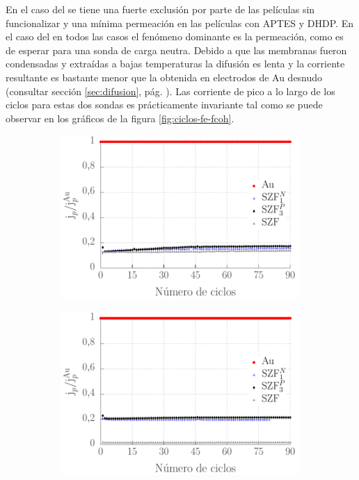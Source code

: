 		
		En el caso del \fe\space se tiene una fuerte exclusión por parte de las películas sin funcionalizar y una mínima permeación en las películas con APTES y DHDP. 
		En el caso del \fc\space en todos las casos el fenómeno dominante es la permeación, como es de esperar para una sonda de carga neutra. Debido a que las membranas fueron condensadas y extraídas a bajas temperaturas la difusión es lenta y la corriente resultante es bastante menor que la obtenida en electrodos de Au desnudo (consultar sección \ref{sec:difusion}, pág. \pageref{sec:difusion}). Las corriente de pico a lo largo de los ciclos para estas dos sondas es prácticamente invariante tal como se puede observar en los gráficos de la figura \ref{fig:ciclos-fe-fcoh}.\vspace*{-4mm}

			\begin{figure}[t!]
		 	\begin{subfigure}[t]{0.495\textwidth}
		 	  \includegraphics[width=\textwidth]{Graficos/ciclosintferroceno.pdf}
		      \end{subfigure}
			\begin{subfigure}[t]{0.495\textwidth}
		 	    \includegraphics[width=\textwidth]{Graficos/ciclosintfecn.pdf}

\end{subfigure}
\end{figure}
